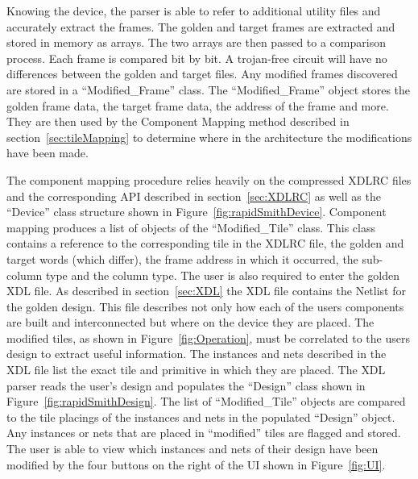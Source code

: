 Knowing the device, the parser is able to refer to additional utility files and accurately extract the frames.
The \gls{golden} and \gls{target} frames are extracted and stored in memory as arrays.
The two arrays are then passed to a comparison process.
Each frame is compared bit by bit.
A trojan-free circuit will have no differences between the \gls{golden} and \gls{target} files.
Any modified frames discovered are stored in a ``Modified\_Frame'' class.
The ``Modified\_Frame'' object stores the \gls{golden} frame data, the \gls{target} frame data, the address of the frame and more.
They are then used by the Component Mapping method described in section~\ref{sec:tileMapping} to determine where in the architecture the modifications have been made.

The component mapping procedure relies heavily on the compressed XDLRC files and the corresponding \acrshort{API} described in section~\ref{sec:XDLRC} as well as the ``Device'' class structure shown in Figure~\ref{fig:rapidSmithDevice}.
Component mapping produces a list of objects of the ``Modified\_Tile'' class.
This class contains a reference to the corresponding tile in the XDLRC file, the \gls{golden} and \gls{target} words (which differ), the frame address in which it occurred, the sub-column type and the column type.
The user is also required to enter the \gls{golden} \acrshort{XDL} file.
As described in section~\ref{sec:XDL} the \acrshort{XDL} file contains the Netlist for the \gls{golden} design.
This file describes not only how each of the users components are built and interconnected but where on the device they are placed.
The modified tiles, as shown in Figure~\ref{fig:Operation}, must be correlated to the users design to extract useful information.
The instances and nets described in the \acrshort{XDL} file list the exact tile and primitive in which they are placed.
The \RapidSmith \acrshort{XDL} parser reads the user's design and populates the ``Design'' class shown in Figure~\ref{fig:rapidSmithDesign}.
The list of ``Modified\_Tile'' objects are compared to the tile placings of the instances and nets in the populated ``Design'' object.
Any instances or nets that are placed in ``modified'' tiles are flagged and stored.
The user is able to view which instances and nets of their design have been modified by the four buttons on the right of the \acrshort{UI} shown in Figure~\ref{fig:UI}.
